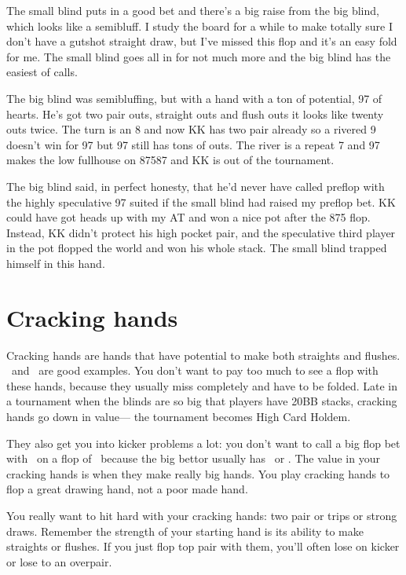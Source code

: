 The small blind puts in a good bet and there's a big raise from the
big blind, which looks like a semibluff. I study the board for a while
to make totally sure I don't have a gutshot straight draw, but I've
missed this flop and it's an easy fold for me. The small blind goes
all in for not much more and the big blind has the easiest of calls.

The big blind was semibluffing, but with a hand with a ton of
potential, 97 of hearts. He's got two pair outs, straight outs and
flush outs it looks like twenty outs twice. The turn is an 8 and now
KK has two pair already so a rivered 9 doesn't win for 97 but 97 still
has tons of outs. The river is a repeat 7 and 97 makes the low
fullhouse on 87587 and KK is out of the tournament.

The big blind said, in perfect honesty, that he'd never have called
preflop with the highly speculative 97 suited if the small blind had
raised my preflop bet. KK could have got heads up with my AT and won a
nice pot after the 875 flop. Instead, KK didn't protect his high
pocket pair, and the speculative third player in the pot flopped the
world and won his whole stack. The small blind trapped himself in this
hand.

\section{Cracking hands}

Cracking hands are hands that have potential to make both straights
and flushes. \nined\eigd\ and \sixd\fourd\ are good examples. You
don't want to pay too much to see a flop with these hands, because
they usually miss completely and have to be folded. Late in a
tournament when the blinds are so big that players have 20BB stacks,
cracking hands go down in value--- the tournament becomes High Card
Holdem.

They also get you into kicker problems a lot: you don't want to call a
big flop bet with \nined\eigd\ on a flop of \ninec\fivec\trec\ because
the big bettor usually has \Ah\nineh\ or \Qs\Qc. The value in your
cracking hands is when they make really big hands. You play cracking
hands to flop a great drawing hand, not a poor made hand.

You really want to hit hard with your cracking hands: two pair or
trips or strong draws. Remember the strength of your starting hand
is its ability to make straights or flushes. If you just flop top
pair with them, you'll often lose on kicker or lose to an overpair.

